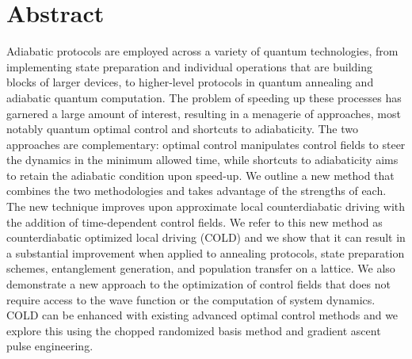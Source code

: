 \chapter{Abstract}\label{chap:abstract}

Adiabatic protocols are employed across a variety of quantum technologies, from implementing state preparation and individual operations that are building blocks of larger devices, to higher-level protocols in quantum annealing and adiabatic quantum computation. The problem of speeding up these processes has garnered a large amount of interest, resulting in a menagerie of approaches, most notably quantum optimal control and shortcuts to adiabaticity. The two approaches are complementary: optimal control manipulates control fields to steer the dynamics in the minimum allowed time, while shortcuts to adiabaticity aims to retain the adiabatic condition upon speed-up. We outline a new method that combines the two methodologies and takes advantage of the strengths of each. The new technique improves upon approximate local counterdiabatic driving with the addition of time-dependent control fields. We refer to this new method as counterdiabatic optimized local driving (COLD) and we show that it can result in a substantial improvement when applied to annealing protocols, state preparation schemes, entanglement generation, and population transfer on a lattice. We also demonstrate a new approach to the optimization of control fields that does not require access to the wave function or the computation of system dynamics. COLD can be enhanced with existing advanced optimal control methods and we explore this using the chopped randomized basis method and gradient ascent pulse engineering.